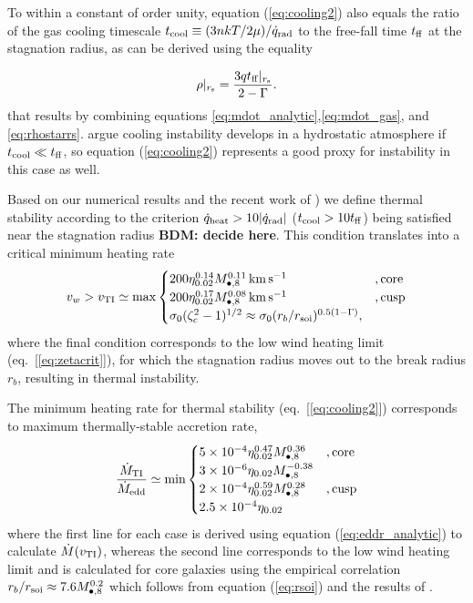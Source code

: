 \documentclass[usenatbib,fleqn]{mn2e}
\newcommand{\tff}{t_{\rm ff}}
\begin{document}
To within a constant of order unity, equation (\ref{eq:cooling2}) also
equals the ratio of the gas cooling timescale $t_{\rm cool} \equiv (3n
kT/2 \mu)/\dot{q}_{\rm rad}$ to the free-fall time $t_{\rm ff}$ at the
stagnation radius, as can be derived using the equality

\begin{align}
\rho|_{r_{\rm s}}=\frac{3 q\tff|_{r_{\rm s}}}{2-\Gamma}.
\label{eq:rhors2}
\end{align}
that results by combining equations
\eqref{eq:mdot_analytic},\eqref{eq:mdot_gas}, and
\eqref{eq:rhostarrs}.  \citet{McCourt+12} argue cooling instability
develops in a hydrostatic atmosphere if $t_{\rm cool} \ll t_{\rm ff}$,
so equation (\ref{eq:cooling2}) represents a good proxy for
instability in this case as well.

Based on our numerical results and the recent work of \citet{McCourt+12}) we define thermal stability according to the criterion $\dot{q}_{\rm heat} > 10|\dot{q}_{\rm rad}|$ ($t_{\rm
  cool} > 10t_{\rm ff}$) being satisfied near the stagnation radius {\bf BDM: decide here}.  This condition translates into a
critical minimum heating rate
\begin{align}
v_{w} > v_{\rm TI} \simeq
  {\rm max}\begin{cases}
   200 \eta_{0.02}^{0.14} M_{\bullet,8}^{0.11}\,{\rm km\,s^{-1}}  &, \text{core}\\
   200 \eta_{0.02}^{0.17} M_{\bullet,8}^{0.08}\,{\rm km\,s^{-1}}   &, \text{cusp}  \\
\sigma_0(\zeta_c^{2}-1)^{1/2} \approx \sigma_0(r_{b}/r_{\rm soi})^{0.5(1-\Gamma)}, 
  \end{cases}
  \label{eq:cooling3}
\end{align}
where the final condition corresponds to the low wind heating limit (eq.~[\ref{eq:zetacrit}]), for which the stagnation radius moves out to the break radius $r_b$, resulting in thermal instability.  

The minimum heating rate for thermal stability (eq.~[\ref{eq:cooling2}]) corresponds to maximum thermally-stable accretion rate,
\begin{align}
\frac{\dot{M}_{\rm TI}}{\dot{M}_{\rm edd}} \simeq
  {\rm min}\begin{cases}
   5\times 10^{-4} \eta_{0.02}^{0.47} M_{\bullet,8}^{0.36} &, \text{core}\\
3\times 10^{-6}\eta_{0.02}M_{\bullet,8}^{-0.38}\\
   2\times 10^{-4} \eta_{0.02}^{0.59} M_{\bullet,8}^{0.28}    &, \text{cusp}\\
2.5\times 10^{-4}\eta_{0.02}
  \end{cases}
  \label{eq:Mdotmax}
\end{align}
where the first line for each case is derived using equation (\ref{eq:eddr_analytic}) to calculate
$\dot{M}(v_{\rm TI})$, whereas the second line corresponds to the low wind heating limit and is calculated for core galaxies using the empirical correlation $r_{b}/r_{\rm soi} \approx 7.6M_{\bullet,8}^{0.2}$ which follows from equation (\ref{eq:rsoi}) and the results of \citet{LauerFaber+:2007a}.  
\end{document}
